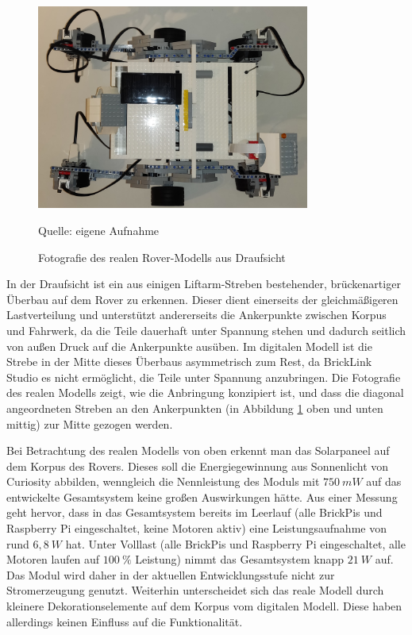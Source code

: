 \begin{figure}
	\centering
	\includegraphics[width=0.8\textwidth]{../Images/20200429_top_01.jpg}
	\vspace{0.5em}
	\parbox[c]{0.8\linewidth}{\footnotesize
		\centering
		\vspace{1em}
		Quelle: eigene Aufnahme
	}
	\caption{Fotografie des realen Rover-Modells aus Draufsicht}
	\label{fig:rovertopfoto}
\end{figure}

In der Draufsicht ist ein aus einigen Liftarm-Streben bestehender, brückenartiger Überbau auf dem Rover zu erkennen.
Dieser dient einerseits der gleichmäßigeren Lastverteilung und unterstützt andererseits die Ankerpunkte zwischen Korpus und Fahrwerk, da die Teile dauerhaft unter Spannung stehen und dadurch seitlich von außen Druck auf die Ankerpunkte ausüben.
Im digitalen Modell ist die Strebe in der Mitte dieses Überbaus asymmetrisch zum Rest, da BrickLink Studio es nicht ermöglicht, die Teile unter Spannung anzubringen.
Die Fotografie des realen Modells zeigt, wie die Anbringung konzipiert ist, und dass die diagonal angeordneten Streben an den Ankerpunkten (in Abbildung \ref{fig:rovertopfoto} oben und unten mittig) zur Mitte gezogen werden.

Bei Betrachtung des realen Modells von oben erkennt man das Solarpaneel auf dem Korpus des Rovers.
Dieses soll die Energiegewinnung aus Sonnenlicht von Curiosity abbilden, wenngleich die Nennleistung des Moduls mit $750\ mW$ auf das entwickelte Gesamtsystem keine großen Auswirkungen hätte.
Aus einer Messung geht hervor, dass in das Gesamtsystem bereits im Leerlauf (alle BrickPis und Raspberry Pi eingeschaltet, keine Motoren aktiv) eine Leistungsaufnahme von rund $6{,}8\ W$ hat.
Unter Volllast (alle BrickPis und Raspberry Pi eingeschaltet, alle Motoren laufen auf $100\ \%$ Leistung) nimmt das Gesamtsystem knapp $21\ W$ auf.
Das Modul wird daher in der aktuellen Entwicklungsstufe nicht zur Stromerzeugung genutzt.
Weiterhin unterscheidet sich das reale Modell durch kleinere Dekorationselemente auf dem Korpus vom digitalen Modell.
Diese haben allerdings keinen Einfluss auf die Funktionalität.

